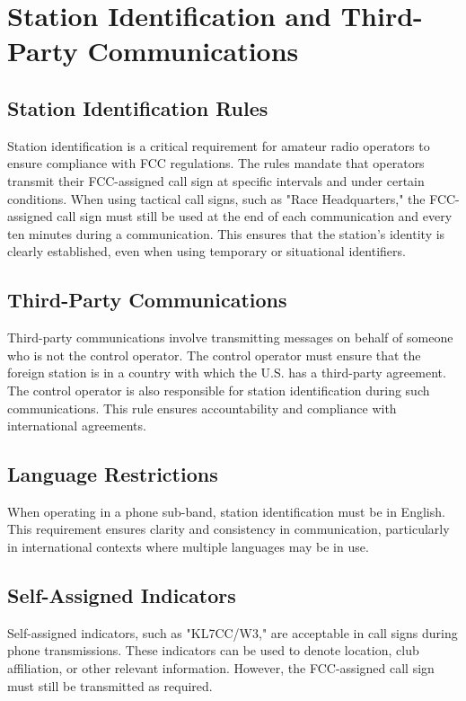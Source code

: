 \section{Station Identification and Third-Party Communications}
\label{sec:station_identification}

\subsection*{Station Identification Rules}
Station identification is a critical requirement for amateur radio operators to ensure compliance with FCC regulations. The rules mandate that operators transmit their FCC-assigned call sign at specific intervals and under certain conditions. When using tactical call signs, such as "Race Headquarters," the FCC-assigned call sign must still be used at the end of each communication and every ten minutes during a communication. This ensures that the station's identity is clearly established, even when using temporary or situational identifiers.

\subsection*{Third-Party Communications}
Third-party communications involve transmitting messages on behalf of someone who is not the control operator. The control operator must ensure that the foreign station is in a country with which the U.S. has a third-party agreement. The control operator is also responsible for station identification during such communications. This rule ensures accountability and compliance with international agreements.

\subsection*{Language Restrictions}
When operating in a phone sub-band, station identification must be in English. This requirement ensures clarity and consistency in communication, particularly in international contexts where multiple languages may be in use.

\subsection*{Self-Assigned Indicators}
Self-assigned indicators, such as "KL7CC/W3," are acceptable in call signs during phone transmissions. These indicators can be used to denote location, club affiliation, or other relevant information. However, the FCC-assigned call sign must still be transmitted as required.

